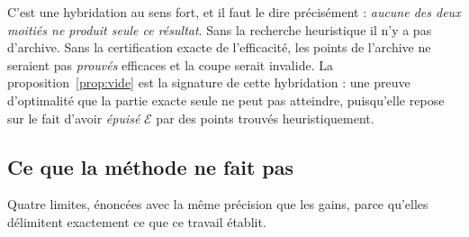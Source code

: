 \documentclass[11pt,a4paper]{article}
\theoremstyle{plain}
\theoremstyle{remark}
\newcommand{\Ecal}{\mathcal{E}}
\begin{document}
C'est une hybridation au sens fort, et il faut le dire précisément :
\emph{aucune des deux moitiés ne produit seule ce résultat}. Sans la
recherche heuristique il n'y a pas d'archive. Sans la certification exacte
de l'efficacité, les points de l'archive ne seraient pas \emph{prouvés}
efficaces et la coupe serait invalide. La proposition~\ref{prop:vide} est la
signature de cette hybridation : une preuve d'optimalité que la partie exacte
seule ne peut pas atteindre, puisqu'elle repose sur le fait d'avoir
\emph{épuisé} $\Ecal$ par des points trouvés heuristiquement.

\subsection*{Ce que la méthode ne fait pas}

Quatre limites, énoncées avec la même précision que les gains, parce
qu'elles délimitent exactement ce que ce travail établit.
\end{document}
